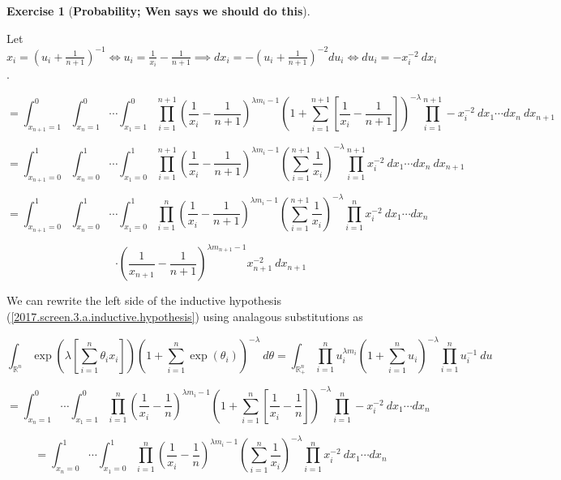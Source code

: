 \documentclass{article}
\theoremstyle{definition}
\newtheorem{exercise}{Exercise}
\theoremstyle{definition}
\theoremstyle{definition}
\theoremstyle{definition}
\begin{document}
\begin{exercise}[\textbf{Probability; Wen says we should do this}]
\begin{enumerate}[(a)]
Let \(x_i = \left(u_i + \frac{1}{n+1} \right)^{-1} \iff u_i = \frac{1}{x_i} - \frac{1}{n+1} \implies dx_i = -\left(u_i + \frac{1}{n+1} \right)^{-2} du_i \iff du_i = -x_i^{-2} \ dx_i  \).

\[
=  \int_{x_{n+1}=1}^0   \int_{x_{n}=1}^0 \cdots \int_{x_1=1}^0  \prod_{i=1}^{n+1} \left( \frac{1}{x_i} - \frac{1}{n+1} \right)^{\lambda m_i - 1}  \left(1 + \sum_{i=1}^{n+1} \left[ \frac{1}{x_i} - \frac{1}{n+1} \right]\right)^{-\lambda} \prod_{i=1}^{n+1} -x_i^{-2}  \ dx_1 \cdots dx_n \ dx_{n+1}
\]

\[
=  \int_{x_{n+1}=0}^1   \int_{x_{n}=0}^1 \cdots \int_{x_1=0}^1  \prod_{i=1}^{n+1} \left( \frac{1}{x_i} - \frac{1}{n+1} \right)^{\lambda m_i - 1}  \left( \sum_{i=1}^{n+1} \frac{1}{x_i}  \right)^{-\lambda} \prod_{i=1}^{n+1} x_i^{-2}  \ dx_1 \cdots dx_n \ dx_{n+1}
\]

\[
=  \int_{x_{n+1}=0}^1   \int_{x_{n}=0}^1 \cdots \int_{x_1=0}^1  \prod_{i=1}^{n} \left( \frac{1}{x_i} - \frac{1}{n+1} \right)^{\lambda m_i - 1}  \left( \sum_{i=1}^{n+1} \frac{1}{x_i}  \right)^{-\lambda} \prod_{i=1}^{n} x_i^{-2}  \ dx_1 \cdots dx_n
\]

\begin{equation}
\cdot  \left( \frac{1}{x_{n+1}} - \frac{1}{n+1} \right)^{\lambda m_{n+1} - 1} x_{n+1}^{-2}  \ dx_{n+1}
\end{equation}


We can rewrite the left side of the inductive hypothesis (\ref{2017.screen.3.a.inductive.hypothesis}) using analagous substitutions as 

\[
\int_{\mathbb{R}^n} \exp \left( \lambda \left[ \sum_{i=1}^n \theta_i x_i \right] \right) \left(1 + \sum_{i=1}^n \exp(\theta_i) \right)^{-\lambda} \ d\theta =  \int_{\mathbb{R}_+^n} \prod_{i=1}^n u_i^{\lambda m_i} \left(1 + \sum_{i=1}^n u_i \right)^{-\lambda} \prod_{i=1}^n u_i^{-1} \ du
\]

\[
 =    \int_{x_{n}=1}^0 \cdots \int_{x_1=1}^0  \prod_{i=1}^n \left( \frac{1}{x_i} - \frac{1}{n}  \right) ^{\lambda m_i - 1} \left(1 + \sum_{i=1}^n  \left[ \frac{1}{x_i} - \frac{1}{n}  \right] \right)^{-\lambda} \prod_{i=1}^n -x_i^{-2} \ dx_1 \cdots dx_n
\]

\[
 =    \int_{x_{n}=0}^1 \cdots \int_{x_1=0}^1  \prod_{i=1}^n \left( \frac{1}{x_i} - \frac{1}{n}  \right) ^{\lambda m_i - 1} \left(\sum_{i=1}^n   \frac{1}{x_i}  \right)^{-\lambda} \prod_{i=1}^n x_i^{-2} \ dx_1 \cdots dx_n
\]



\end{enumerate}
\end{exercise}
\end{document}

